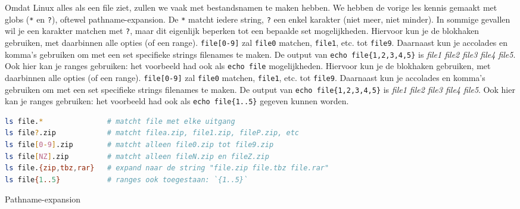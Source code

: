 Omdat Linux alles als een file ziet, zullen we vaak met bestandsnamen te maken hebben. We hebben de vorige les kennis gemaakt met globs (\texttt{*} en \texttt{?}), oftewel pathname-expansion. De \texttt{*} matcht iedere string, \texttt{?} een enkel karakter (niet meer, niet minder). In sommige gevallen wil je een karakter matchen met \texttt{?}, maar dit eigenlijk beperken tot een bepaalde set mogelijkheden. Hiervoor kun je de blokhaken gebruiken, met daarbinnen alle opties (of een range). \texttt{file{[}0-9{]}} zal \texttt{file0} matchen, \texttt{file1}, etc. tot \texttt{file9}. Daarnaast kun je accolades en komma's gebruiken om met een set specifieke strings filenames te maken. De output van \texttt{echo\ file\{1,2,3,4,5\}} is \emph{file1 file2 file3 file4 file5}. Ook hier kan je ranges gebruiken: het voorbeeld had ook als \texttt{echo\ file} mogelijkheden. Hiervoor kun je de blokhaken gebruiken, met daarbinnen alle opties (of een range). \texttt{file{[}0-9{]}} zal \texttt{file0} matchen, \texttt{file1}, etc. tot \texttt{file9}. Daarnaast kun je accolades en komma's gebruiken om met een set specifieke strings filenames te maken. De output van \texttt{echo\ file\{1,2,3,4,5\}} is \emph{file1 file2 file3 file4 file5}. Ook hier kan je ranges gebruiken: het voorbeeld had ook als \texttt{echo\ file\{1..5\}} gegeven kunnen worden.

\begin{listing}
\begin{lstlisting}[language=Bash]
ls file.*               # matcht file met elke uitgang
ls file?.zip            # matcht filea.zip, file1.zip, fileP.zip, etc
ls file[0-9].zip        # matcht alleen file0.zip tot file9.zip
ls file[NZ].zip         # matcht alleen fileN.zip en fileZ.zip
ls file.{zip,tbz,rar}   # expand naar de string "file.zip file.tbz file.rar"
ls file{1..5}           # ranges ook toegestaan: `{1..5}`
\end{lstlisting}
\caption{Pathname-expansion}
\end{listing}

